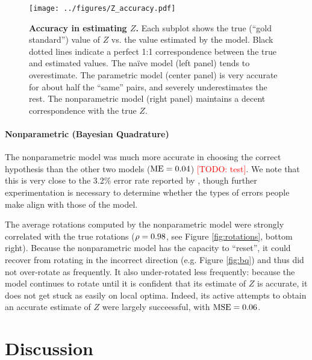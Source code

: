 \documentclass{article} %
\newcommand{\TODO}[1]{\textcolor{red}{[TODO: #1]}}
\newcommand{\naive}[0]{na\"ive}
\begin{document}
\begin{figure}[t]
  \centering
  \texttt{[image: ../figures/Z\_accuracy.pdf]}
  \caption{\textbf{Accuracy in estimating $Z$.} Each subplot shows the
    true (``gold standard'') value of $Z$ vs. the value estimated by
    the model. Black dotted lines indicate a perfect 1:1
    correspondence between the true and estimated values. The \naive{}
    model (left panel) tends to overestimate. The parametric model
    (center panel) is very accurate for about half the ``same'' pairs,
    and severely underestimates the rest. The nonparametric model
    (right panel) maintains a decent correspondence with the true
    $Z$.}
  \label{fig:accuracy}
\end{figure}


\paragraph{Nonparametric (Bayesian Quadrature)}

The nonparametric model was much more accurate in choosing the correct
hypothesis than the other two models ($\mathrm{ME}{}=0.04{}$) \TODO{test}. We note
that this is very close to the 3.2\% error rate reported by
\cite{Shepard1971}, though further experimentation is necessary to
determine whether the types of errors people make align with those of
the model.

The average rotations computed by the nonparametric model were
strongly correlated with the true rotations ($\rho=0.98$, see Figure
\ref{fig:rotations}, bottom right). Because the nonparametric model
has the capacity to ``reset'', it could recover from rotating in the
incorrect direction (e.g. Figure \ref{fig:bq}) and thus did not
over-rotate as frequently.  It also under-rotated less frequently:
because the model continues to rotate until it is confident that its
estimate of $Z$ is accurate, it does not get stuck as easily on local
optima.  Indeed, its active attempts to obtain an accurate estimate of
$Z$ were largely succeessful, with $\mathrm{MSE}{}=0.06{}$.


\section{Discussion}
\end{document}
